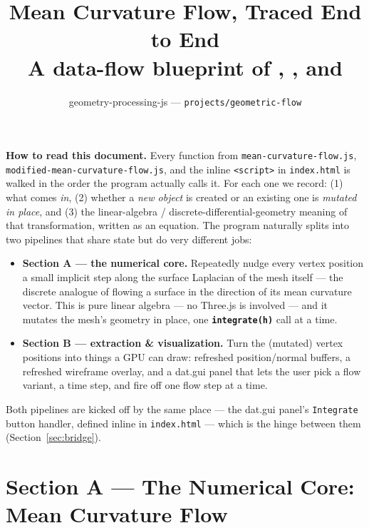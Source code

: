 \documentclass[11pt]{article}
\title{\textbf{Mean Curvature Flow, Traced End to End}\\[2pt]
\large A data-flow blueprint of \code{mean-curvature-flow.js},
\code{modified-mean-curvature-flow.js}, and \code{index.html}}
\author{geometry-processing-js --- \texttt{projects/geometric-flow}}
\date{}
\newcommand{\code}[1]{\texttt{#1}}
\newcommand{\func}[1]{\texttt{\textbf{#1}}}
\begin{document}
\maketitle

\vspace{-1.2em}
\begin{center}
\begin{minipage}{0.9\textwidth}
\small
\textbf{How to read this document.} Every function from \code{mean-curvature-flow.js},
\code{modified-mean-curvature-flow.js}, and the inline \code{<script>} in \code{index.html}
is walked in the order the program actually calls it. For each one we record: (1) what
comes \emph{in}, (2) whether a \emph{new object} is created or an existing one is
\emph{mutated in place}, and (3) the linear-algebra / discrete-differential-geometry meaning
of that transformation, written as an equation. The program naturally splits into two
pipelines that share state but do very different jobs:

\begin{itemize}[leftmargin=1.4em]
  \item \textbf{Section A --- the numerical core.} Repeatedly nudge every vertex position
    a small implicit step along the surface Laplacian of the mesh itself --- the discrete
    analogue of flowing a surface in the direction of its mean curvature vector. This is
    pure linear algebra --- no Three.js is involved --- and it mutates the mesh's geometry
    in place, one \func{integrate(h)} call at a time.
  \item \textbf{Section B --- extraction \& visualization.} Turn the (mutated) vertex
    positions into things a GPU can draw: refreshed position/normal buffers, a refreshed
    wireframe overlay, and a dat.gui panel that lets the user pick a flow variant, a time
    step, and fire off one flow step at a time.
\end{itemize}
Both pipelines are kicked off by the same place --- the dat.gui panel's \code{Integrate}
button handler, defined inline in \code{index.html} --- which is the hinge between them
(Section~\ref{sec:bridge}).
\end{minipage}
\end{center}

\tableofcontents

\section{Section A --- The Numerical Core: Mean Curvature Flow}
\label{sec:sectionA}
\end{document}

